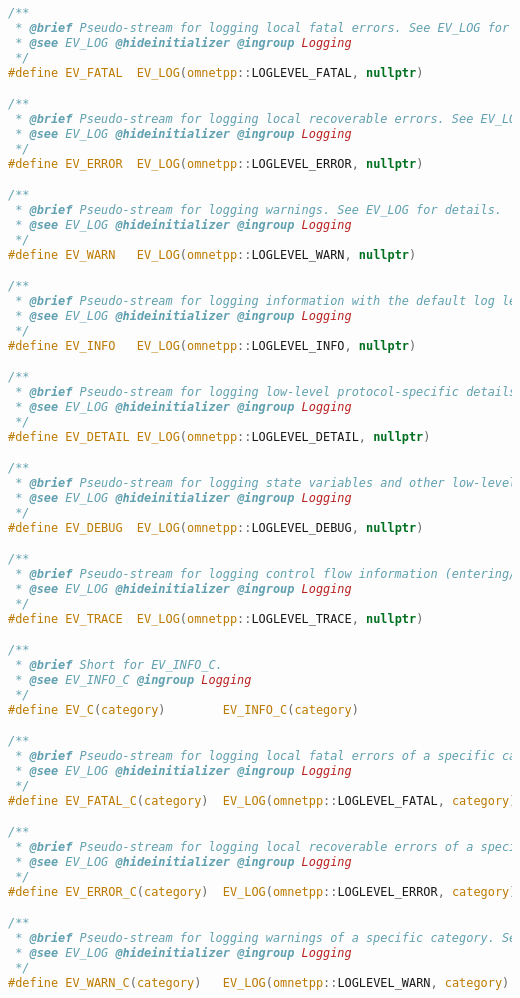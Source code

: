 \begin{lstlisting}[language=c]
/**
 * @brief Pseudo-stream for logging local fatal errors. See EV_LOG for details.
 * @see EV_LOG @hideinitializer @ingroup Logging
 */
#define EV_FATAL  EV_LOG(omnetpp::LOGLEVEL_FATAL, nullptr)

/**
 * @brief Pseudo-stream for logging local recoverable errors. See EV_LOG for details.
 * @see EV_LOG @hideinitializer @ingroup Logging
 */
#define EV_ERROR  EV_LOG(omnetpp::LOGLEVEL_ERROR, nullptr)

/**
 * @brief Pseudo-stream for logging warnings. See EV_LOG for details.
 * @see EV_LOG @hideinitializer @ingroup Logging
 */
#define EV_WARN   EV_LOG(omnetpp::LOGLEVEL_WARN, nullptr)

/**
 * @brief Pseudo-stream for logging information with the default log level. See EV_LOG for details.
 * @see EV_LOG @hideinitializer @ingroup Logging
 */
#define EV_INFO   EV_LOG(omnetpp::LOGLEVEL_INFO, nullptr)

/**
 * @brief Pseudo-stream for logging low-level protocol-specific details. See EV_LOG for details.
 * @see EV_LOG @hideinitializer @ingroup Logging
 */
#define EV_DETAIL EV_LOG(omnetpp::LOGLEVEL_DETAIL, nullptr)

/**
 * @brief Pseudo-stream for logging state variables and other low-level information. See EV_LOG for details.
 * @see EV_LOG @hideinitializer @ingroup Logging
 */
#define EV_DEBUG  EV_LOG(omnetpp::LOGLEVEL_DEBUG, nullptr)

/**
 * @brief Pseudo-stream for logging control flow information (entering/exiting functions, etc). See EV_LOG for details.
 * @see EV_LOG @hideinitializer @ingroup Logging
 */
#define EV_TRACE  EV_LOG(omnetpp::LOGLEVEL_TRACE, nullptr)

/**
 * @brief Short for EV_INFO_C.
 * @see EV_INFO_C @ingroup Logging
 */
#define EV_C(category)        EV_INFO_C(category)

/**
 * @brief Pseudo-stream for logging local fatal errors of a specific category. See EV_LOG for details.
 * @see EV_LOG @hideinitializer @ingroup Logging
 */
#define EV_FATAL_C(category)  EV_LOG(omnetpp::LOGLEVEL_FATAL, category)

/**
 * @brief Pseudo-stream for logging local recoverable errors of a specific category. See EV_LOG for details.
 * @see EV_LOG @hideinitializer @ingroup Logging
 */
#define EV_ERROR_C(category)  EV_LOG(omnetpp::LOGLEVEL_ERROR, category)

/**
 * @brief Pseudo-stream for logging warnings of a specific category. See EV_LOG for details.
 * @see EV_LOG @hideinitializer @ingroup Logging
 */
#define EV_WARN_C(category)   EV_LOG(omnetpp::LOGLEVEL_WARN, category)


\end{lstlisting}
